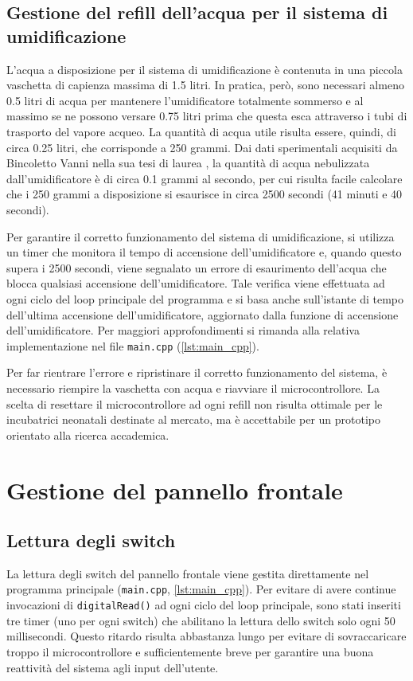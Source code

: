 \subsection{Gestione del refill dell'acqua per il sistema di umidificazione}
L'acqua a disposizione per il sistema di umidificazione è contenuta in una piccola vaschetta di capienza massima di 1.5 litri.
In pratica, però, sono necessari almeno 0.5 litri di acqua per mantenere l'umidificatore totalmente sommerso e al massimo
se ne possono versare 0.75 litri prima che questa esca attraverso i tubi di trasporto del vapore acqueo. La quantità di acqua
utile risulta essere, quindi, di circa 0.25 litri, che corrisponde a 250 grammi.
Dai dati sperimentali acquisiti da Bincoletto Vanni nella sua tesi di laurea \cite{bincoletto2025}, la quantità di acqua
nebulizzata dall'umidificatore è di circa 0.1 grammi al secondo, per cui risulta facile calcolare che i 250 grammi
a disposizione si esaurisce in circa 2500 secondi (41 minuti e 40 secondi).

Per garantire il corretto funzionamento del sistema di umidificazione, si utilizza un timer che monitora il tempo di accensione
dell'umidificatore e, quando questo supera i 2500 secondi, viene segnalato un errore di esaurimento dell'acqua che blocca
qualsiasi accensione dell'umidificatore. Tale verifica viene effettuata ad ogni ciclo del loop principale del programma
e si basa anche sull'istante di tempo dell'ultima accensione dell'umidificatore, aggiornato dalla funzione di accensione
dell'umidificatore. Per maggiori approfondimenti si rimanda alla relativa implementazione nel file \verb|main.cpp|
(\autoref{lst:main_cpp}).

Per far rientrare l'errore e ripristinare il corretto funzionamento del sistema, è necessario riempire la vaschetta con acqua
e riavviare il microcontrollore. La scelta di resettare il microcontrollore ad ogni refill non risulta ottimale per le
incubatrici neonatali destinate al mercato, ma è accettabile per un prototipo orientato alla ricerca accademica.

\section{Gestione del pannello frontale}
\subsection{Lettura degli switch}
La lettura degli switch del pannello frontale viene gestita direttamente nel programma principale (\verb|main.cpp|,
\autoref{lst:main_cpp}). Per evitare di avere continue invocazioni di \verb|digitalRead()| ad ogni ciclo
del loop principale, sono stati inseriti tre timer (uno per ogni switch) che abilitano la lettura dello switch solo
ogni 50 millisecondi. Questo ritardo risulta abbastanza lungo per evitare di sovraccaricare troppo il microcontrollore
e sufficientemente breve per garantire una buona reattività del sistema agli input dell'utente.

